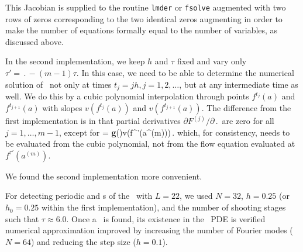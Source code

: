 This Jacobian is supplied to the routine {\tt lmder} or {\tt fsolve}
augmented with two rows of zeros corresponding to the two identical
zeros augmenting  in order to make the number of
equations formally equal to the number of variables,
as discussed above.

In the second implementation, we keep $h$ and $\tau$ fixed and vary
only $\tau' = \period{} - (m-1)\tau$.  In this case, we need to be
able to determine the numerical solution of \KSe\ not only at times
$t_j = jh, j = 1, 2, \ldots$, but at any intermediate time as well.
We do this by a cubic polynomial interpolation through points
$f^{t_j}(a)$ and $f^{t_{j+1}}(a)$ with slopes $v(f^{t_j}(a))$ and
$v(f^{t_{j+1}}(a))$.  The difference from the first implementation
is in that partial derivatives $\partial F^{(j)}/\partial \period{}$
are zero for all $j = 1,\ldots,m-1$, except for
\beq
   =
  {\bf g}(\shift)v(f^{\tau'}(a^{(m)}))\,.
\eeq
which, for consistency, needs to be evaluated from the cubic
polynomial, not from the flow equation evaluated
at $f^{\tau'}(a^{(m)})$.

We found the second implementation more convenient.

For detecting periodic and \rpo s of the \KSe\ with $L = 22$, we used
$N = 32$, $h = 0.25$ (or $h_0 = 0.25$ within the first implementation),
and the number of shooting stages such that $\tau \approx 6.0$.
Once a \rpo\ is found, its existence in the \KS\ PDE is verified
 numerical approximation improved by increasing the number of
Fourier modes ($N = 64$) and reducing the step size ($h = 0.1$).
